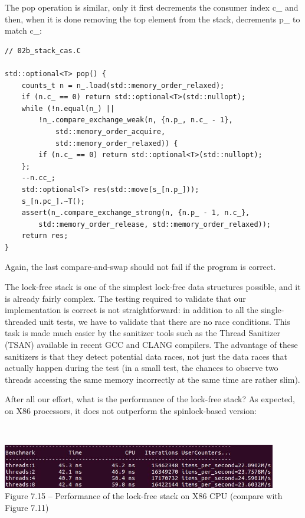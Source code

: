 The pop operation is similar, only it first decrements the consumer index c\_ and then, when it is done removing the top element from the stack, decrements p\_ to match c\_:

\begin{lstlisting}[style=styleCXX]
	// 02b_stack_cas.C
	
std::optional<T> pop() {
	counts_t n = n_.load(std::memory_order_relaxed);
	if (n.c_ == 0) return std::optional<T>(std::nullopt);
	while (!n.equal(n_) ||
		!n_.compare_exchange_weak(n, {n.p_, n.c_ - 1},
			std::memory_order_acquire,
			std::memory_order_relaxed)) {
		if (n.c_ == 0) return std::optional<T>(std::nullopt);
	};
	--n.cc_;
	std::optional<T> res(std::move(s_[n.p_]));
	s_[n.pc_].~T();
	assert(n_.compare_exchange_strong(n, {n.p_ - 1, n.c_},
		std::memory_order_release, std::memory_order_relaxed));
	return res;
}
\end{lstlisting}

Again, the last compare-and-swap should not fail if the program is correct.

The lock-free stack is one of the simplest lock-free data structures possible, and it is already fairly complex. The testing required to validate that our implementation is correct is not straightforward: in addition to all the single-threaded unit tests, we have to validate that there are no race conditions. This task is made much easier by the sanitizer tools such as the Thread Sanitizer (TSAN) available in recent GCC and CLANG compilers. The advantage of these sanitizers is that they detect potential data races, not just the data races that actually happen during the test (in a small test, the chances to observe two threads accessing the same memory incorrectly at the same time are rather slim).

After all our effort, what is the performance of the lock-free stack? As expected, on X86 processors, it does not outperform the spinlock-based version:

\hspace*{\fill} \\ %
\begin{center}
\includegraphics[width=0.9\textwidth]{content/2/chapter7/images/15.jpg}\\ 
Figure 7.15 – Performance of the lock-free stack on X86 CPU (compare with Figure 7.11)
\end{center}

